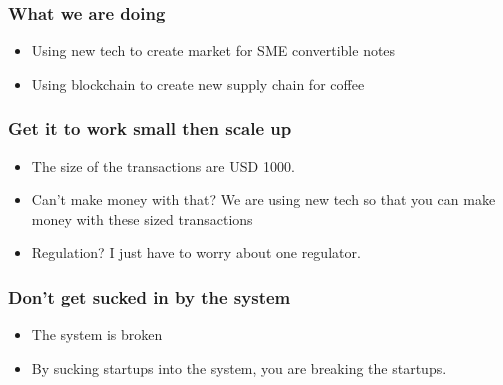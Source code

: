 \documentclass{beamer}
\begin{document}
\begin{frame}
  \frametitle{What we are doing}
  \begin{itemize}
  \item Using new tech to create market for SME convertible notes
  \item Using blockchain to create new supply chain for coffee
  \end{itemize}
\end{frame}
\begin{frame}
  \frametitle{Get it to work small then scale up}
  \begin{itemize}
  \item The size of the transactions are USD 1000.
  \item Can't make money with that?  We are using new tech so that
    you can make money with these sized transactions
  \item Regulation?  I just have to worry about one regulator.
  \end{itemize}
\end{frame}
\begin{frame}
  \frametitle{Don't get sucked in by the system}
  \begin{itemize}
  \item The system is broken
    \item By sucking startups into the system, you are breaking the
      startups.
  \end{itemize}
\end{frame}
\end{document}

